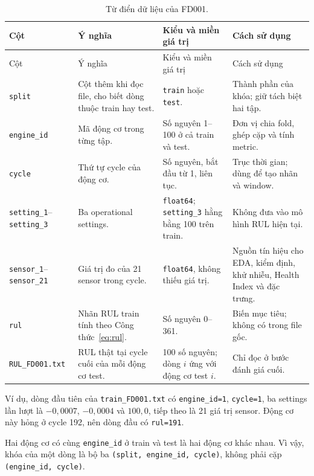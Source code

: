 \begin{small}
\setlength{\tabcolsep}{3pt}
\begin{longtable}{@{}L{2.6cm}L{3.9cm}L{3.2cm}L{4.0cm}@{}}
\caption[Từ điển dữ liệu FD001]{Từ điển dữ liệu của FD001.}\label{tab:data-dictionary}\\
\toprule
Cột & Ý nghĩa & Kiểu và miền giá trị & Cách sử dụng\\
\midrule
\endfirsthead
\toprule
Cột & Ý nghĩa & Kiểu và miền giá trị & Cách sử dụng\\
\midrule
\endhead
\bottomrule
\endlastfoot
\texttt{split} & Cột thêm khi đọc file, cho biết dòng thuộc train hay test. &
\texttt{train} hoặc \texttt{test}. & Thành phần của khóa; giữ tách biệt hai
tập.\\[0.35em]
\texttt{engine\_id} & Mã động cơ trong từng tập. & Số nguyên 1--100 ở cả train
và test. & Đơn vị chia fold, ghép cặp và tính metric.\\[0.35em]
\texttt{cycle} & Thứ tự cycle của động cơ. & Số nguyên, bắt đầu từ 1, liên tục.
& Trục thời gian; dùng để tạo nhãn và window.\\[0.35em]
\texttt{setting\_1}--\texttt{setting\_3} & Ba operational settings. &
\texttt{float64}; \texttt{setting\_3} hằng bằng 100 trên train. & Không đưa vào
mô hình RUL hiện tại.\\[0.35em]
\texttt{sensor\_1}--\texttt{sensor\_21} & Giá trị đo của 21 sensor trong cycle.
& \texttt{float64}, không thiếu giá trị. & Nguồn tín hiệu cho EDA, kiểm định,
khử nhiễu, Health Index và đặc trưng.\\[0.35em]
\texttt{rul} & Nhãn RUL train tính theo Công thức~\eqref{eq:rul}. & Số nguyên
0--361. & Biến mục tiêu; không có trong file gốc.\\[0.35em]
\texttt{RUL\_FD001.txt} & RUL thật tại cycle cuối của mỗi động cơ test. & 100
số nguyên; dòng $i$ ứng với động cơ test $i$. & Chỉ đọc ở bước đánh giá cuối.\\
\end{longtable}
\end{small}

Ví dụ, dòng đầu tiên của \texttt{train\_FD001.txt} có \texttt{engine\_id=1},
\texttt{cycle=1}, ba settings lần lượt là $-0{,}0007$, $-0{,}0004$ và
$100{,}0$, tiếp theo là 21 giá trị sensor. Động cơ này hỏng ở cycle 192, nên
dòng đầu có \texttt{rul=191}.

Hai động cơ có cùng \texttt{engine\_id} ở train và test là hai động cơ khác
nhau. Vì vậy, khóa của một dòng là bộ ba \texttt{(split, engine\_id, cycle)},
không phải cặp \texttt{(engine\_id, cycle)}.

